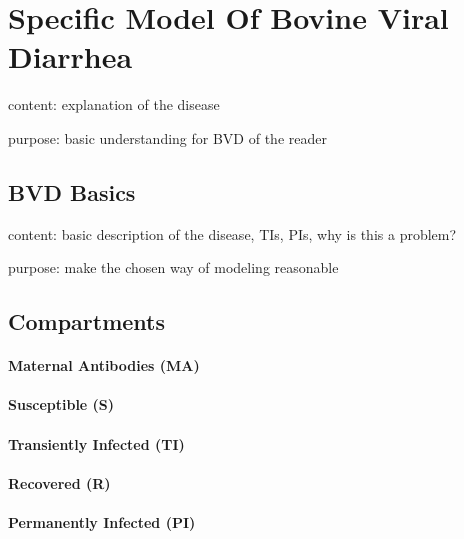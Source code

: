 \section{Specific Model Of Bovine Viral Diarrhea}
content: explanation of the disease

purpose: basic understanding for BVD of the reader
\subsection{BVD Basics}
content: basic description of the disease, TIs, PIs, why is this a problem?

purpose: make the chosen way of modeling reasonable
\subsection{Compartments}
\paragraph{Maternal Antibodies (MA)}
\paragraph{Susceptible (S)}
\paragraph{Transiently Infected (TI)}
\paragraph{Recovered (R)}
\paragraph{Permanently Infected (PI)}